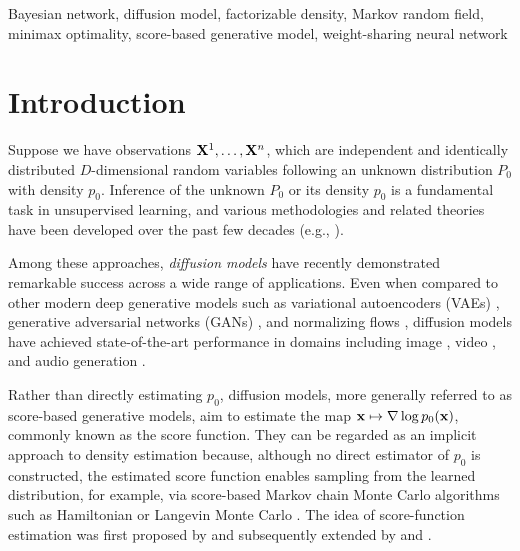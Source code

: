 \documentclass[twoside,11pt]{article}
\newcommand{\bx}{{\bf x}}
\newcommand{\bX}{{\bf X}}
\begin{document}
\begin{keywords}
Bayesian network, diffusion model, factorizable density, Markov random field, minimax optimality, score-based generative model, weight-sharing neural network
\end{keywords}


\section{Introduction}
\label{sec:intro}

Suppose we have observations $\bX^{1}, \ldots, \bX^{n}$, which are independent and identically distributed $D$-dimensional random variables following an unknown distribution $P_{0}$ with density $p_{0}$. 
Inference of the unknown $P_0$ or its density $p_{0}$ is a fundamental task in unsupervised learning, and various methodologies and related theories have been developed over the past few decades (e.g., \citealp{hastie2009elements, tsybakov2008introduction, gine2016mathematical}).


Among these approaches, \emph{diffusion models} have recently demonstrated remarkable success across a wide range of applications. Even when compared to other modern deep generative models such as variational autoencoders (VAEs) \citep{kingma2013auto, rezende2014stochastic}, generative adversarial networks (GANs) \citep{goodfellow2014generative, arjovsky2017wasserstein, mroueh2018sobolev}, and normalizing flows \citep{dinh2015nice, rezende2015variational}, diffusion models have achieved state-of-the-art performance in domains including image \citep{rombach2022high, dhariwal2021diffusion}, video \citep{ho2022video}, and audio generation \citep{kong2021diffwave}.

Rather than directly estimating $p_0$, diffusion models, more generally referred to as score-based generative models, aim to estimate the map $\bx \mapsto \nabla \log p_0(\bx)$, commonly known as the score function. They can be regarded as an implicit approach to density estimation because, although no direct estimator of $p_0$ is constructed, the estimated score function enables sampling from the learned distribution, for example, via score-based Markov chain Monte Carlo algorithms such as Hamiltonian or Langevin Monte Carlo \citep{neal2011mcmc}.
The idea of score-function estimation was first proposed by \citet{hyvarinen2005estimation} and subsequently extended by \citet{vincent2011connection} and \citet{song2020sliced}.
\end{document}
